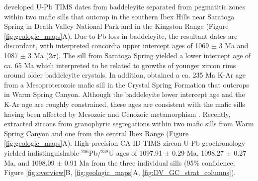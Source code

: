 \cite{Heaman1992b} developed U-Pb TIMS dates from baddeleyite separated from pegmatitic zones within two mafic sills that outcrop in the southern Ibex Hills near Saratoga Spring in Death Valley National Park and in the Kingston Range (Figure \ref{fig:geologic_maps}A). Due to Pb loss in baddeleyite, the resultant dates are discordant, with interpreted concordia upper intercept ages of 1069 $\pm$ 3 Ma and 1087 $\pm$ 3 Ma (2$\sigma$). The sill from Saratoga Spring yielded a lower intercept age of ca. 65 Ma which \cite{Heaman1992b} interpreted to be related to growths of younger zircon rims around older baddeleyite crystals. In addition, \cite{Wasserburg1964a} obtained a ca. 235 Ma K-Ar age from a Mesoproterozoic mafic sill in the Crystal Spring Formation that outcrops in Warm Spring Canyon. Although the baddeleyite lower intercept age and the K-Ar age are roughly constrained, these ages are consistent with the mafic sills having been affected by Mesozoic and Cenozoic metamorphism \citep{Snow1989a, Snow2000a}. Recently, \cite{Mohr2024a} extracted zircons from granophyric segregations within two mafic sills from Warm Spring Canyon and one from the central Ibex Range (Figure \ref{fig:geologic_maps}A). High-precision CA-ID-TIMS zircon U-Pb geochronology yielded indistinguishable $^{206}$Pb/$^{238}$U ages of 1097.91  $\pm$  0.29 Ma, 1098.27  $\pm$  0.27 Ma, and 1098.09  $\pm$  0.91 Ma from the three individual sills (95\% confidence; Figure \ref{fig:overview}B, \ref{fig:geologic_maps}A, \ref{fig:DV_GC_strat_columns}). 

